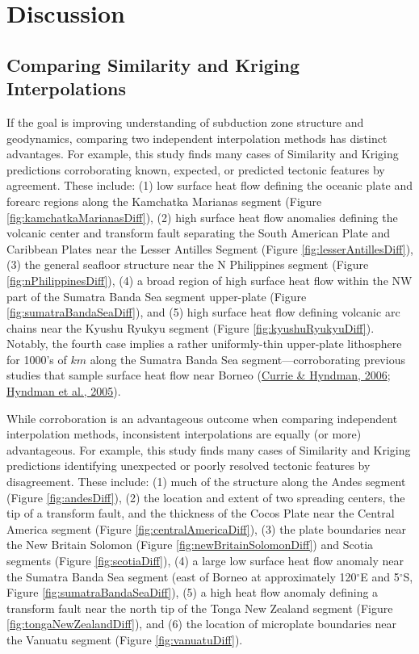 \clearpage

\hypertarget{chpt3Discussion}{%
\section{Discussion}\label{chpt3Discussion}}

\hypertarget{interpDiffDiscussion}{%
\subsection{Comparing Similarity and Kriging Interpolations}\label{interpDiffDiscussion}}

If the goal is improving understanding of subduction zone structure and geodynamics, comparing two independent interpolation methods has distinct advantages. For example, this study finds many cases of Similarity and Kriging predictions corroborating known, expected, or predicted tectonic features by agreement. These include: (1) low surface heat flow defining the oceanic plate and forearc regions along the Kamchatka Marianas segment (Figure \ref{fig:kamchatkaMarianasDiff}), (2) high surface heat flow anomalies defining the volcanic center and transform fault separating the South American Plate and Caribbean Plates near the Lesser Antilles Segment (Figure \ref{fig:lesserAntillesDiff}), (3) the general seafloor structure near the N Philippines segment (Figure \ref{fig:nPhilippinesDiff}), (4) a broad region of high surface heat flow within the NW part of the Sumatra Banda Sea segment upper-plate (Figure \ref{fig:sumatraBandaSeaDiff}), and (5) high surface heat flow defining volcanic arc chains near the Kyushu Ryukyu segment (Figure \ref{fig:kyushuRyukyuDiff}). Notably, the fourth case implies a rather uniformly-thin upper-plate lithosphere for 1000's of \(km\) along the Sumatra Banda Sea segment---corroborating previous studies that sample surface heat flow near Borneo (\protect\hyperlink{ref-currie2006}{Currie \& Hyndman, 2006}; \protect\hyperlink{ref-hyndman2005}{Hyndman et al., 2005}).

While corroboration is an advantageous outcome when comparing independent interpolation methods, inconsistent interpolations are equally (or more) advantageous. For example, this study finds many cases of Similarity and Kriging predictions identifying unexpected or poorly resolved tectonic features by disagreement. These include: (1) much of the structure along the Andes segment (Figure \ref{fig:andesDiff}), (2) the location and extent of two spreading centers, the tip of a transform fault, and the thickness of the Cocos Plate near the Central America segment (Figure \ref{fig:centralAmericaDiff}), (3) the plate boundaries near the New Britain Solomon (Figure \ref{fig:newBritainSolomonDiff}) and Scotia segments (Figure \ref{fig:scotiaDiff}), (4) a large low surface heat flow anomaly near the Sumatra Banda Sea segment (east of Borneo at approximately 120\(^\circ\)E and 5\(^\circ\)S, Figure \ref{fig:sumatraBandaSeaDiff}), (5) a high heat flow anomaly defining a transform fault near the north tip of the Tonga New Zealand segment (Figure \ref{fig:tongaNewZealandDiff}), and (6) the location of microplate boundaries near the Vanuatu segment (Figure \ref{fig:vanuatuDiff}).

